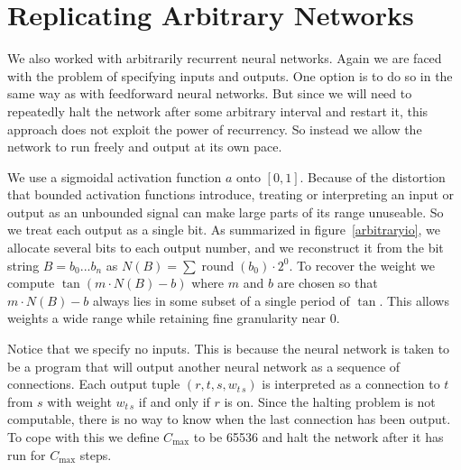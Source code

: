 \documentclass[12pt]{article}
\begin{document}
\section{Replicating Arbitrary Networks}
\label{arbitrary}

We also worked with arbitrarily recurrent neural networks.
Again we are faced with the problem
of specifying inputs and outputs.
One option is to do so in the same way
as with feedforward neural networks.
But since we will need
to repeatedly halt the network
after some arbitrary interval
and restart it,
this approach does not exploit
the power of recurrency.
So instead we allow the network to run freely
and output at its own pace.

We use a sigmoidal activation function $a$ onto $[0, 1]$.
Because of the distortion
that bounded activation functions introduce,
treating or interpreting an input or output
as an unbounded signal
can make large parts of its range unuseable.
So we treat each output
as a single bit.
As summarized in figure~\ref{arbitraryio},
we allocate several bits
to each output number,
and we reconstruct it from the bit string
$B = b_0...b_n$
as $N(B) = \sum \operatorname{round}(b_0) \cdot 2^0$.
To recover the weight we compute $\tan(m \cdot N(B) - b)$
where $m$ and $b$ are chosen so that $m \cdot N(B) - b$
always lies in some subset of a single period of $\tan$.
This allows weights a wide range
while retaining fine granularity near 0.

Notice that we specify no inputs.
This is because the neural network is taken to be a program
that will output another neural network
as a sequence of connections.
Each output tuple $(r, t, s, w_{t\,s})$
is interpreted as a connection to $t$ from $s$
with weight $w_{t\,s}$ if and only if $r$ is on.
Since the halting problem is not computable,
there is no way to know
when the last connection has been output.
To cope with this
we define $C_\text{max}$ to be 65536
and halt the network after it has run
for $C_\text{max}$ steps.


\end{document}
